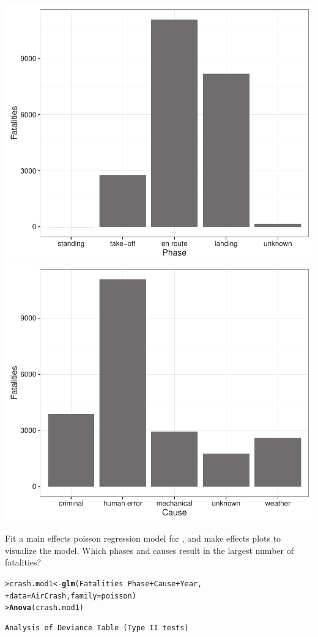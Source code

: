\documentclass[10pt]{report}\usepackage[]{graphicx}\usepackage[]{color}
\makeatletter
\newcommand{\hlopt}[1]{\textcolor[rgb]{0,0,0}{#1}}%
\newcommand{\hlstd}[1]{\textcolor[rgb]{0.345,0.345,0.345}{#1}}%
\newcommand{\hlkwb}[1]{\textcolor[rgb]{0.69,0.353,0.396}{#1}}%
\newcommand{\hlkwc}[1]{\textcolor[rgb]{0.333,0.667,0.333}{#1}}%
\newcommand{\hlkwd}[1]{\textcolor[rgb]{0.737,0.353,0.396}{\textbf{#1}}}%
\newenvironment{kframe}{%
 \def\at@end@of@kframe{}%
 \ifinner\ifhmode%
  \def\at@end@of@kframe{\end{minipage}}%
  \begin{minipage}{\columnwidth}%
 \fi\fi%
 \def\FrameCommand##1{\hskip\@totalleftmargin \hskip-\fboxsep
 \colorbox{shadecolor}{##1}\hskip-\fboxsep
     \hskip-\linewidth \hskip-\@totalleftmargin \hskip\columnwidth}%
 \MakeFramed {\advance\hsize-\width
   \@totalleftmargin\z@ \linewidth\hsize
   \@setminipage}}%
 {\par\unskip\endMakeFramed%
 \at@end@of@kframe}
\newenvironment{knitrout}{}{} %
\renewenvironment{knitrout}{\small\renewcommand{\baselinestretch}{.85}}{} %
\makeatother
\begin{document}
\begin{Exercises}
\begin{enumerate*}
\begin{ans}
\begin{knitrout}
\centerline{\includegraphics[width=.49\textwidth]{soln/fig/ex11_3a2-1} 
\includegraphics[width=.49\textwidth]{soln/fig/ex11_3a2-2} }



\end{knitrout}

    \end{ans}
    
    \item Fit a main effects poisson regression model for , and make effects plots to visualize the model.
    Which phases and causes result in the largest number of fatalities?
    \begin{ans}
\begin{knitrout}\footnotesize
{}\color{fgcolor}\begin{kframe}
\begin{alltt}
\hlstd{> }\hlstd{crash.mod1} \hlkwb{<-} \hlkwd{glm}\hlstd{(Fatalities} \hlopt{~} \hlstd{Phase} \hlopt{+} \hlstd{Cause} \hlopt{+} \hlstd{Year,}
\hlstd{+ }                 \hlkwc{data}\hlstd{=AirCrash,} \hlkwc{family}\hlstd{=poisson)}
\hlstd{> }\hlkwd{Anova}\hlstd{(crash.mod1)}
\end{alltt}
\begin{verbatim}
Analysis of Deviance Table (Type II tests)


\end{verbatim}
\end{kframe}
\end{knitrout}
\end{ans}
\end{enumerate*}
\end{Exercises}
\end{document}
